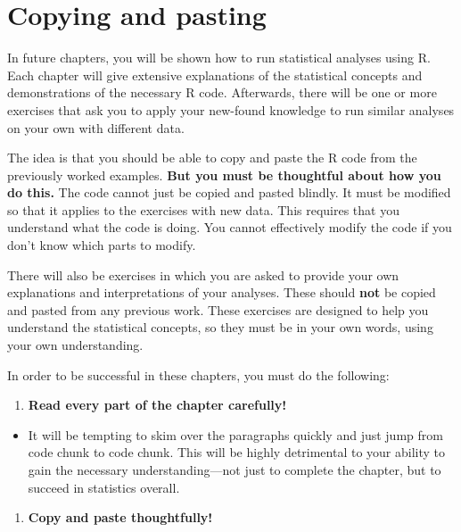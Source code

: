 \documentclass[
]{book}
\providecommand{\tightlist}{%
  \setlength{\itemsep}{0pt}\setlength{\parskip}{0pt}}
\begin{document}
\hypertarget{rmark-copypaste}{%
\section{Copying and pasting}\label{rmark-copypaste}}

In future chapters, you will be shown how to run statistical analyses using R. Each chapter will give extensive explanations of the statistical concepts and demonstrations of the necessary R code. Afterwards, there will be one or more exercises that ask you to apply your new-found knowledge to run similar analyses on your own with different data.

The idea is that you should be able to copy and paste the R code from the previously worked examples. \textbf{But you must be thoughtful about how you do this.} The code cannot just be copied and pasted blindly. It must be modified so that it applies to the exercises with new data. This requires that you understand what the code is doing. You cannot effectively modify the code if you don't know which parts to modify.

There will also be exercises in which you are asked to provide your own explanations and interpretations of your analyses. These should \textbf{not} be copied and pasted from any previous work. These exercises are designed to help you understand the statistical concepts, so they must be in your own words, using your own understanding.

In order to be successful in these chapters, you must do the following:

\begin{enumerate}
\def\labelenumi{\arabic{enumi}.}
\tightlist
\item
  \textbf{Read every part of the chapter carefully!}
\end{enumerate}

\begin{itemize}
\tightlist
\item
  It will be tempting to skim over the paragraphs quickly and just jump from code chunk to code chunk. This will be highly detrimental to your ability to gain the necessary understanding---not just to complete the chapter, but to succeed in statistics overall.
\end{itemize}

\begin{enumerate}
\def\labelenumi{\arabic{enumi}.}
\setcounter{enumi}{1}
\tightlist
\item
  \textbf{Copy and paste thoughtfully!}
\end{enumerate}
\end{document}
